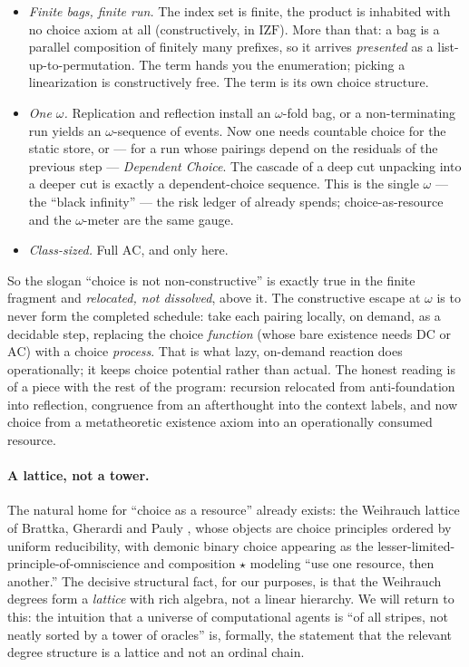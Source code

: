 \begin{itemize}[leftmargin=1.4em]
\item \emph{Finite bags, finite run.} The index set is finite, the product is
inhabited with no choice axiom at all (constructively, in $\mathrm{IZF}$). More
than that: a bag is a parallel composition of finitely many prefixes, so it
arrives \emph{presented} as a list-up-to-permutation. The term hands you the
enumeration; picking a linearization is constructively free. The term is its own
choice structure.

\item \emph{One $\omega$.} Replication and reflection install an $\omega$-fold
bag, or a non-terminating run yields an $\omega$-sequence of events. Now one needs
countable choice for the static store, or --- for a run whose pairings depend on
the residuals of the previous step --- \emph{Dependent Choice}. The cascade of a
deep cut unpacking into a deeper cut \cite{paths} is exactly a dependent-choice
sequence. This is the single $\omega$ --- the ``black infinity'' --- the risk
ledger of \cite{qcs} already spends; choice-as-resource and the $\omega$-meter
are the same gauge.

\item \emph{Class-sized.} Full $\mathrm{AC}$, and only here.
\end{itemize}

\noindent
So the slogan ``choice is not non-constructive'' is exactly true in the finite
fragment and \emph{relocated, not dissolved}, above it. The constructive escape
at $\omega$ is to never form the completed schedule: take each pairing locally, on
demand, as a decidable step, replacing the choice \emph{function} (whose bare
existence needs $\mathrm{DC}$ or $\mathrm{AC}$) with a choice \emph{process}. That
is what lazy, on-demand reaction does operationally; it keeps choice potential
rather than actual. The honest reading is of a piece with the rest of the
program: recursion relocated from anti-foundation into reflection, congruence
from an afterthought into the context labels, and now choice from a metatheoretic
existence axiom into an operationally consumed resource.

\paragraph{A lattice, not a tower.}
The natural home for ``choice as a resource'' already exists: the Weihrauch
lattice of Brattka, Gherardi and Pauly \cite{weihrauch}, whose objects are
choice principles ordered by uniform reducibility, with demonic binary choice
appearing as the lesser-limited-principle-of-omniscience and composition
$\star$ modeling ``use one resource, then another.'' The decisive structural
fact, for our purposes, is that the Weihrauch degrees form a \emph{lattice} with
rich algebra, not a linear hierarchy. We will return to this: the intuition that
a universe of computational agents is ``of all stripes, not neatly sorted by a
tower of oracles'' is, formally, the statement that the relevant degree structure
is a lattice and not an ordinal chain.


